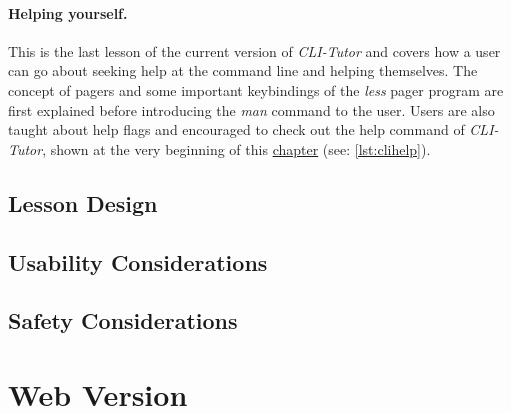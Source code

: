 \paragraph{Helping yourself.} This is the last lesson of the current version of
\textit{CLI-Tutor} and covers how a user can go about seeking help at the
command line and helping themselves. The concept of pagers and some important
keybindings of the \textit{less} pager program are first explained before
introducing the \textit{man} command to the user. Users are also taught about
help flags and encouraged to check out the help command of \textit{CLI-Tutor},
shown at the very beginning of this \hyperref[chap:clitutor]{chapter} (see:
\autoref{lst:clihelp}).

\subsection{Lesson Design}
\subsection{Usability Considerations}
\subsection{Safety Considerations}
\section{Web Version}



